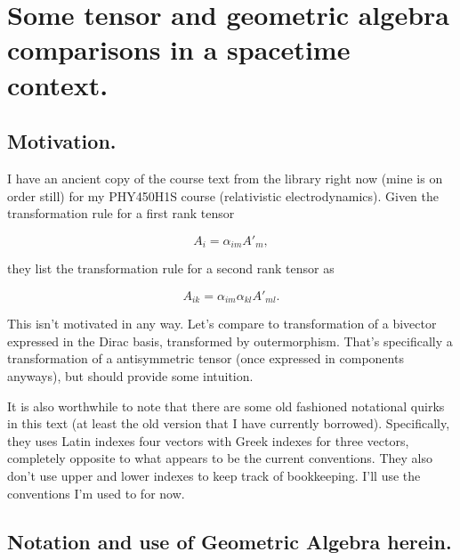%
%

\chapter{Some tensor and geometric algebra comparisons in a spacetime context.}
\label{chap:antisymmetricTensorTx}
{}
\date{Jan 14, 2011}

\beginArtWithToc

\section{Motivation.}

I have an ancient copy of the course text \citep{landau1951classical} from the library right now (mine is on order still) for my PHY450H1S course (relativistic electrodynamics).  Given the transformation rule for a first rank tensor

\begin{equation}\label{eqn:antisymmetricTensorTx:5}
A_{i} = \alpha_{im} A'_{m},
\end{equation}

they list the transformation rule for a second rank tensor as

\begin{equation}\label{eqn:antisymmetricTensorTx:10}
A_{ik} = \alpha_{im} \alpha_{kl} A'_{ml}.
\end{equation}

This isn't motivated in any way.  Let's compare to transformation of a bivector expressed in the Dirac basis, transformed by outermorphism.  That's specifically a transformation of a antisymmetric tensor (once expressed in components anyways), but should provide some intuition.

It is also worthwhile to note that there are some old fashioned notational quirks in this text (at least the old version that I have currently borrowed).  Specifically, they uses Latin indexes four vectors with Greek indexes for three vectors, completely opposite to what appears to be the current conventions.  They also don't use upper and lower indexes to keep track of bookkeeping.  I'll use the conventions I'm used to for now.

\section{Notation and use of Geometric Algebra herein.}

